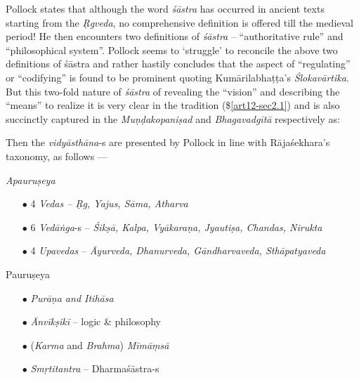 Pollock states that although the word {\sl śāstra} has occurred in ancient texts starting from the {\sl Ṛgveda}, no comprehensive deﬁnition is offered till the medieval period! He then encounters two deﬁnitions of {\sl śāstra} -- ``authoritative rule'' and ``philosophical system''. Pollock seems to `struggle' to reconcile the above two deﬁnitions of śāstra and rather hastily concludes that the aspect of ``regulating'' or ``codifying'' is found to be prominent quoting Kumārilabhaṭṭa's   {\sl Ślokavārtika}. But this two-fold nature of {\sl śāstra} of revealing the ``vision'' and describing the ``means'' to realize it is very clear in the tradition (\$\ref{art12-sec2.1}) and is also succinctly captured in the {\sl Muṇḍakopaniṣad} and {\sl Bhagavadgītā} respectively as: 

Then the {\sl vidyāsthāna}-s are presented by Pollock in line with Rājaśekhara's taxonomy, as follows ---

{\sl Apauruṣeya}
\begin{itemize}
\item[$\bullet$] 4 {\sl Vedas -- Ṛg, Yajus, Sāma, Atharva}

\item[$\bullet$] 6 {\sl Vedāṅga}-s -- {\sl Śikṣā, Kalpa, Vyākaraṇa, Jyautiṣa, Chandas, Nirukta}

\item[$\bullet$] 4 {\sl Upavedas} -- {\sl Āyurveda, Dhanurveda, Gāndharvaveda, Sthāpatyaveda}
\end{itemize}

Pauruṣeya
\begin{itemize}
\item[$\bullet$] {\sl Purāṇa and Itihāsa}

\item[$\bullet$] {\sl Ānvīkṣikī} -- logic \& philosophy

\item[$\bullet$] ({\sl Karma} and {\sl Brahma}) {\sl Mīmāṃsā}

\item[$\bullet$] {\sl Smṛtitantra} -- Dharmaśāstra-s
\end{itemize}

